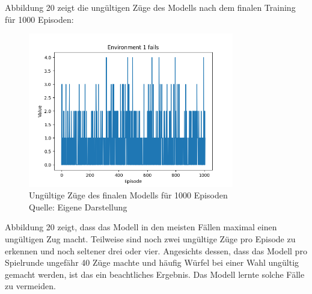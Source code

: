 Abbildung 20 zeigt die ungültigen Züge des Modells nach dem finalen Training für 1000 Episoden:
\nopagebreak
\begin{figure}[H]
	\centering
	\includegraphics[width=0.8\textwidth]{Bilder/maskableppo_ganzschoenclever_193avg_v3.1f}
	\caption[Ungültige Züge des finalen Modells für 1000 Episoden]{Ungültige Züge des finalen Modells für 1000 Episoden\\ Quelle: Eigene Darstellung}
\end{figure}

Abbildung 20 zeigt, dass das Modell in den meisten Fällen maximal einen ungültigen Zug macht. Teilweise sind noch zwei ungültige Züge pro Episode zu erkennen und noch seltener drei oder vier. Angesichts dessen, dass das Modell pro Spielrunde ungefähr 40 Züge machte und häufig Würfel bei einer Wahl ungültig gemacht werden, ist das ein beachtliches Ergebnis. Das Modell lernte solche Fälle zu vermeiden.\\

